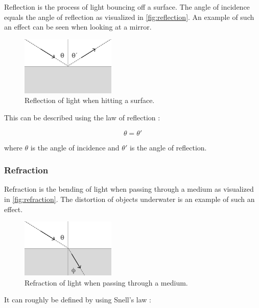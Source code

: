 Reflection is the process of light bouncing off a surface. The angle of incidence equals the angle of reflection as visualized in \autoref{fig:reflection}. An example of such an effect can be seen when looking at a mirror.

\begin{figure}[H]
  \centering
  \includegraphics[width=0.4\textwidth]{resources/reflection.png}
  \caption{Reflection of light when hitting a surface.}
  \label{fig:reflection}
\end{figure}

This can be described using the law of reflection \cite{fowles1989introduction}:

\begin{equation}
  \label{eqn:law-of-reflection}
  \theta = \theta'
\end{equation}

where $\theta$ is the angle of incidence and $\theta'$ is the angle of reflection.

\subsubsection{Refraction}

Refraction is the bending of light when passing through a medium as visualized in \autoref{fig:refraction}. The distortion of objects underwater is an example of such an effect.

\begin{figure}[H]
  \centering
  \includegraphics[width=0.4\textwidth]{resources/refraction.png}
  \caption{Refraction of light when passing through a medium.}
  \label{fig:refraction}
\end{figure}

It can roughly be defined by using Snell's law \cite{fowles1989introduction}:

